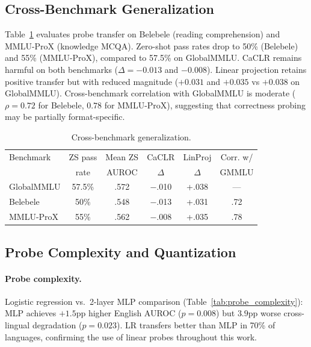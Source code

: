 \documentclass[11pt,a4paper]{article}
\newcommand{\auroc}{AUROC}
\begin{document}
\subsection{Cross-Benchmark Generalization}
\label{sec:benchmark}

Table~\ref{tab:benchmark} evaluates probe transfer on Belebele (reading comprehension) and MMLU-ProX (knowledge MCQA).
Zero-shot pass rates drop to 50\% (Belebele) and 55\% (MMLU-ProX), compared to 57.5\% on GlobalMMLU.
CaCLR remains harmful on both benchmarks ($\Delta = -0.013$ and $-0.008$).
Linear projection retains positive transfer but with reduced magnitude ($+0.031$ and $+0.035$ vs $+0.038$ on GlobalMMLU).
Cross-benchmark correlation with GlobalMMLU is moderate ($\rho = 0.72$ for Belebele, $0.78$ for MMLU-ProX), suggesting that correctness probing may be partially format-specific.

\begin{table}[t]
\centering
\small
\caption{Cross-benchmark generalization.}
\label{tab:benchmark}
\begin{tabular}{lccccc}
\toprule
Benchmark & ZS pass & Mean ZS & CaCLR & LinProj & Corr. w/ \\
          & rate    & \auroc{} & $\Delta$ & $\Delta$ & GMMLU \\
\midrule
GlobalMMLU & 57.5\% & .572 & $-$.010 & +.038 & --- \\
Belebele   & 50\%   & .548 & $-$.013 & +.031 & .72 \\
MMLU-ProX  & 55\%   & .562 & $-$.008 & +.035 & .78 \\
\bottomrule
\end{tabular}
\end{table}

\subsection{Probe Complexity and Quantization}
\label{sec:auxiliary}

\paragraph{Probe complexity.}
Logistic regression vs.\ 2-layer MLP comparison (Table~\ref{tab:probe_complexity}): MLP achieves $+1.5$pp higher English \auroc{} ($p = 0.008$) but $3.9$pp worse cross-lingual degradation ($p = 0.023$).
LR transfers better than MLP in 70\% of languages, confirming the use of linear probes throughout this work.
\end{document}

